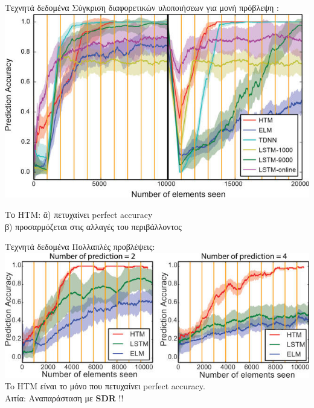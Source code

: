 \documentclass[11pt,center]{beamer}
\begin{document}
\begin{frame}{Τεχνητά δεδομένα}
  Σύγκριση διαφορετικών υλοποιήσεων για μονή πρόβλεψη \tiny{\cite{continuous}}:\\
  \vspace{1em}
  \includegraphics[width=0.7 \textwidth,center]{../pics/single_prediction.jpg}
  \pause
  \begin{tabbing}
	Το HTM:  \=α) πετυχαίνει perfect accuracy\\
	  \>β) προσαρμόζεται στις αλλαγές του περιβάλλοντος\\
  \end{tabbing}
\end{frame}

\begin{frame}{Τεχνητά δεδομένα}
  Πολλαπλές προβλέψεις:
  \vfill
  \includegraphics[width=0.7 \textwidth,center]{../pics/multiple_predictions.jpg}
  \pause
  \vfill
  To HTM είναι το \alert{μόνο} που πετυχαίνει perfect accuracy.\\
  \pause
  Αιτία: Αναπαράσταση με \textbf{SDR} !!
\end{frame}
\end{document}
